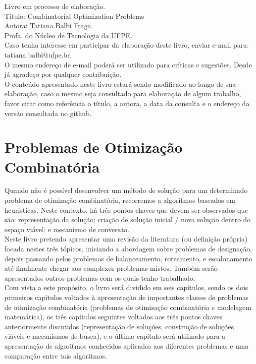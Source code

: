 \documentclass{book}
\begin{document}
Livro em processo de elaboração. \\

Título: Combinatorial Optimization Problems\\

Autora: Tatiana Balbi Fraga. \\

Profa. do Núcleo de Tecnologia da UFPE. \\

Caso tenha interesse em participar da elaboração deste livro, enviar e-mail para: tatiana.balbi@ufpe.br.\\

O mesmo endereço de e-mail poderá ser utilizado para críticas e sugestões. Desde já agradeço por qualquer contribuição. \\

O conteúdo apresentado neste livro estará sendo modificado ao longo de sua elaboração, caso o mesmo seja consultado para elaboração de algum trabalho, favor citar como referência o título, a autora, a data da consulta e o endereço da versão consultada no github. \\

\chapter{Problemas de Otimização Combinatória}

Quando não é possível desenvolver um método de solução para um determinado problema de otimização combinatória, recorremos a algoritmos baseados em heurísticas. Neste contexto, há três pontos chaves que devem ser observados que são: representação da solução; criação de solução inicial / nova solução dentro do espaço viável; e mecanismo de conversão. \\

Neste livro pretendo apresentar uma revisão da literatura (ou definição própria) focada nestes três tópicos, iniciando a abordagem sobre problemas de designação, depois passando pelos problemas de balanceamento, roteamento, e escalonamento até finalmente chegar aos complexos problemas mistos. Também serão apresentados outros problemas com os quais tenho trabalhado. \\

Com vista a este propósito, o livro será dividido em seis capítulos, sendo os dois primeiros capítulos voltados à apresentação de importantes classes de problemas de otimização combinatória (problemas de otimização combinatória e modelagem matemática), os três capítulos seguintes voltados aos três pontos chaves anteriormente discutidos (representação de soluções, construção de soluções viáveis e mecanismos de busca), e o último capítulo será utilizado para a apresentação de algoritmos conhecidos aplicados aos diferentes problemas e uma comparação entre tais algoritmos. \\
\end{document}
